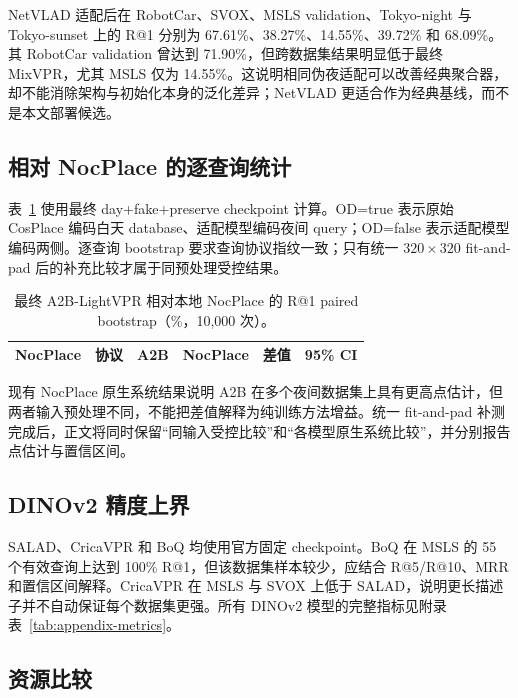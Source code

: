 \documentclass[UTF8,a4paper,11pt]{ctexart}
\begin{document}
NetVLAD 适配后在 RobotCar、SVOX、MSLS validation、Tokyo-night 与 Tokyo-sunset 上的 R@1 分别为 67.61\%、38.27\%、14.55\%、39.72\% 和 68.09\%。其 RobotCar validation 曾达到 71.90\%，但跨数据集结果明显低于最终 MixVPR，尤其 MSLS 仅为 14.55\%。这说明相同伪夜适配可以改善经典聚合器，却不能消除架构与初始化本身的泛化差异；NetVLAD 更适合作为经典基线，而不是本文部署候选。

\subsection{相对 NocPlace 的逐查询统计}
表~\ref{tab:nocplace-bootstrap} 使用最终 day+fake+preserve checkpoint 计算。OD=true 表示原始 CosPlace 编码白天 database、适配模型编码夜间 query；OD=false 表示适配模型编码两侧。逐查询 bootstrap 要求查询协议指纹一致；只有统一 $320\times320$ fit-and-pad 后的补充比较才属于同预处理受控结果。
\begin{table}[htbp]
\centering
\caption{最终 A2B-LightVPR 相对本地 NocPlace 的 R@1 paired bootstrap（\%，10,000 次）。}
\label{tab:nocplace-bootstrap}
\begin{tabular}{llrrrr}
\toprule
NocPlace & 协议 & A2B & NocPlace & 差值 & 95\% CI\\
\midrule

\end{tabular}
\end{table}

现有 NocPlace 原生系统结果说明 A2B 在多个夜间数据集上具有更高点估计，但两者输入预处理不同，不能把差值解释为纯训练方法增益。统一 fit-and-pad 补测完成后，正文将同时保留“同输入受控比较”和“各模型原生系统比较”，并分别报告点估计与置信区间。

\subsection{DINOv2 精度上界}
SALAD、CricaVPR 和 BoQ 均使用官方固定 checkpoint。BoQ 在 MSLS 的 55 个有效查询上达到 100\% R@1，但该数据集样本较少，应结合 R@5/R@10、MRR 和置信区间解释。CricaVPR 在 MSLS 与 SVOX 上低于 SALAD，说明更长描述子并不自动保证每个数据集更强。所有 DINOv2 模型的完整指标见附录表~\ref{tab:appendix-metrics}。

\subsection{资源比较}
\begin{table}[htbp]
\centering
\caption{同设备 PyTorch FP16 batch-1 资源对照。百万图内存按 FP32 描述子计算。}
\label{tab:resources}
\end{table}
\end{document}
